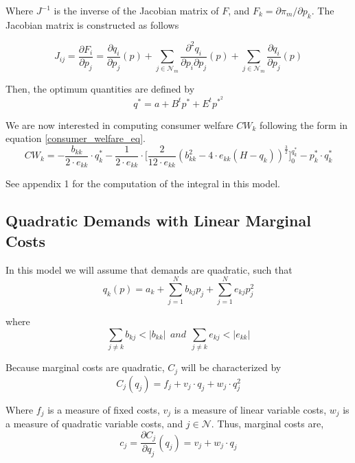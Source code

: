 \documentclass[12pt]{article}
\begin{document}
Where $J^{-1}$ is the inverse of the Jacobian matrix of $F$, and $F_k = \partial \pi_m / \partial p_k$. The Jacobian matrix is constructed as follows

\begin{equation}
J_{ij} = \frac{\partial F_i}{\partial p_j} = \frac{\partial q_i}{\partial p_j}(p) + \sum_{j \in \mathcal{N}_m} \frac{\partial^2 q_i}{\partial p_i \partial p_j}(p) + \sum_{j \in \mathcal{N}_m} \frac{\partial q_i}{\partial p_j}(p)
\end{equation}

Then, the optimum quantities are defined by 
\begin{equation*}
q^* = a + B^t p^* + E^t p^{*^2}
\end{equation*}

We are now interested in computing consumer welfare $CW_k$ following the form in equation \ref{consumer_welfare_eq}.
\begin{equation*}
CW_k = -\frac{b_{kk}}{2 \cdot e_{kk}} \cdot q_k^* -\frac{1}{2 \cdot e_{kk}} \cdot \bigg[\frac{2}{12 \cdot e_{kk}} (b_{kk}^2 - 4 \cdot e_{kk}(H - q_k))^{\frac{3}{2}}\bigg]_0^{q_k^*} - p_k^* \cdot q_k^*
\end{equation*}

See appendix 1 for the computation of the integral in this model.  

\subsection{Quadratic Demands with Linear Marginal Costs}

In this model we will assume that demands are quadratic, such that
\begin{equation*}
q_k(p) = a_k + \sum_{j = 1}^N b_{kj} p_j + \sum_{j = 1}^N e_{kj}p_j^2
\end{equation*}

where
\begin{equation*}
\sum_{j \neq k} b_{kj} < |b_{kk}| \ \ and \ \ \sum_{j \neq k} e_{kj} < |e_{kk}|
\end{equation*}

Because marginal costs are quadratic, $C_j$ will be characterized by
\begin{equation*}
C_j(q_j) = f_j + v_j \cdot q_j + w_j \cdot q_j^2
\end{equation*}

Where $f_j$ is a measure of fixed costs, $v_j$ is a measure of linear variable costs, $w_j$ is a measure of quadratic variable costs, and $j \in \mathcal{N}$. Thus, marginal costs are,
\begin{equation*}
c_j = \frac{\partial C_j}{\partial q_j}(q_j)= v_j + w_j \cdot q_j
\end{equation*}
\end{document}
